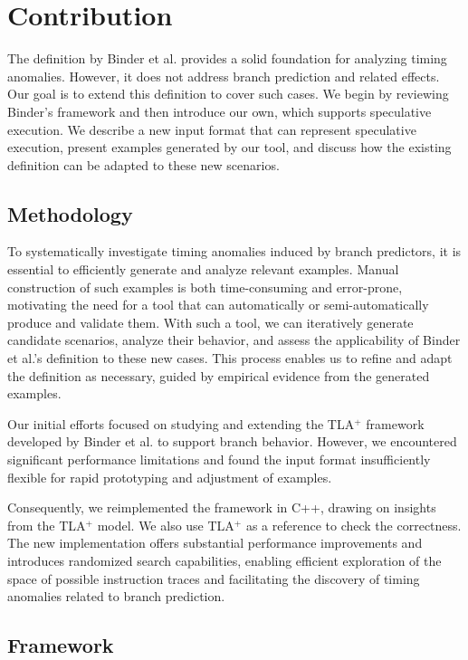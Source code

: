 \chapter{Contribution}

The definition by Binder et al. \cite{binder_definitions_2022} provides a solid foundation for analyzing timing anomalies. However, it does not address branch prediction and related effects. Our goal is to extend this definition to cover such cases. We begin by reviewing Binder's framework and then introduce our own, which supports speculative execution. We describe a new input format that can represent speculative execution, present examples generated by our tool, and discuss how the existing definition can be adapted to these new scenarios.

\section{Methodology}
To systematically investigate timing anomalies induced by branch predictors, it is essential to efficiently generate and analyze relevant examples. Manual construction of such examples is both time-consuming and error-prone, motivating the need for a tool that can automatically or semi-automatically produce and validate them. With such a tool, we can iteratively generate candidate scenarios, analyze their behavior, and assess the applicability of Binder et al.'s definition to these new cases. This process enables us to refine and adapt the definition as necessary, guided by empirical evidence from the generated examples.

Our initial efforts focused on studying and extending the TLA$^+$ \cite{lamport_specifying_2003} framework developed by Binder et al.  to support branch behavior. However, we encountered significant performance limitations and found the input format insufficiently flexible for rapid prototyping and adjustment of examples.

Consequently, we reimplemented the framework in C++, drawing on insights from the TLA$^+$ model. We also use TLA$^+$ as a reference to check the correctness. The new implementation offers substantial performance improvements and introduces randomized search capabilities, enabling efficient exploration of the space of possible instruction traces and facilitating the discovery of timing anomalies related to branch prediction.

\section{Framework}

